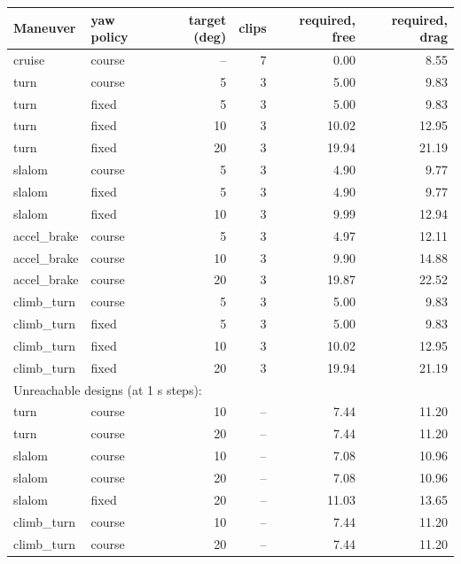 \footnotesize
\begin{tabular}{llrrrr}
\toprule
Maneuver & yaw policy & target (deg) & clips & required, free & required, drag \\
\midrule
cruise & course & -- & 7 & 0.00 & 8.55 \\
turn & course & 5 & 3 & 5.00 & 9.83 \\
turn & fixed & 5 & 3 & 5.00 & 9.83 \\
turn & fixed & 10 & 3 & 10.02 & 12.95 \\
turn & fixed & 20 & 3 & 19.94 & 21.19 \\
slalom & course & 5 & 3 & 4.90 & 9.77 \\
slalom & fixed & 5 & 3 & 4.90 & 9.77 \\
slalom & fixed & 10 & 3 & 9.99 & 12.94 \\
accel\_brake & course & 5 & 3 & 4.97 & 12.11 \\
accel\_brake & course & 10 & 3 & 9.90 & 14.88 \\
accel\_brake & course & 20 & 3 & 19.87 & 22.52 \\
climb\_turn & course & 5 & 3 & 5.00 & 9.83 \\
climb\_turn & fixed & 5 & 3 & 5.00 & 9.83 \\
climb\_turn & fixed & 10 & 3 & 10.02 & 12.95 \\
climb\_turn & fixed & 20 & 3 & 19.94 & 21.19 \\
\midrule
\multicolumn{6}{l}{\footnotesize Unreachable designs (at 1 s steps):} \\
turn & course & 10 & -- & 7.44 & 11.20 \\
turn & course & 20 & -- & 7.44 & 11.20 \\
slalom & course & 10 & -- & 7.08 & 10.96 \\
slalom & course & 20 & -- & 7.08 & 10.96 \\
slalom & fixed & 20 & -- & 11.03 & 13.65 \\
climb\_turn & course & 10 & -- & 7.44 & 11.20 \\
climb\_turn & course & 20 & -- & 7.44 & 11.20 \\
\bottomrule
\end{tabular}
